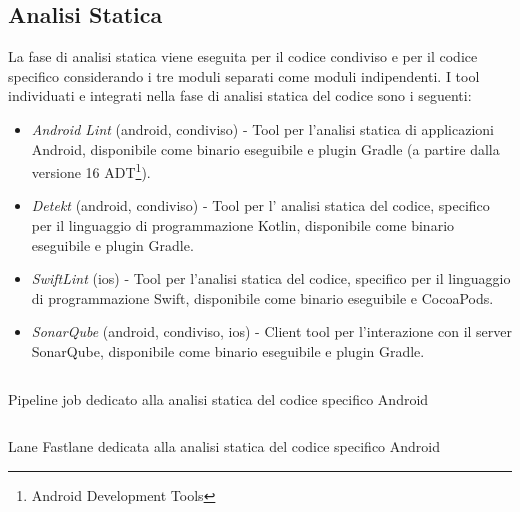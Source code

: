 \subsection{Analisi Statica}
La fase di analisi statica viene eseguita per il codice condiviso e per il codice specifico considerando i tre moduli separati come moduli indipendenti. I tool individuati e integrati nella fase di analisi statica del codice sono i seguenti:
\begin{itemize}
    \item \textit{Android Lint} (android, condiviso) - Tool per l'analisi statica di applicazioni Android, disponibile come binario eseguibile e plugin Gradle (a partire dalla versione 16 ADT\footnote{Android Development Tools}).
    \item \textit{Detekt} (android, condiviso) - Tool per l' analisi statica del codice, specifico per il linguaggio di programmazione Kotlin, disponibile come binario eseguibile e plugin Gradle.
    \item \textit{SwiftLint} (ios) - Tool per l'analisi statica del codice, specifico per il linguaggio di programmazione Swift, disponibile come binario eseguibile e CocoaPods.
    \item \textit{SonarQube} (android, condiviso, ios) - Client tool per l'interazione con il server SonarQube, disponibile come binario eseguibile e plugin Gradle.
\end{itemize}

\begin{listing}[H]
\inputminted{yaml}{code/4-sastjob}
\caption{Pipeline job dedicato alla analisi statica del codice specifico Android}
\end{listing}

\begin{listing}[H]
\inputminted{ruby}{code/4-sastfastlane}
\caption{Lane Fastlane dedicata alla analisi statica del codice specifico Android}
\end{listing}

